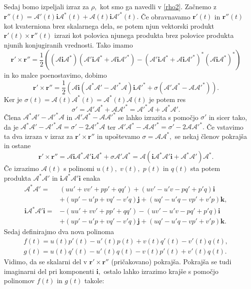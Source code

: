 \documentclass[12pt,a4paper,twoside]{article}
\theoremstyle{definition} %
\theoremstyle{plain} %
\numberwithin{equation}{section}  %
\newcommand{\rV}{\mathbf{r}}
\newcommand{\iV}{\mathbf{i}}
\newcommand{\jV}{\mathbf{j}}
\newcommand{\kV}{\mathbf{k}}
\newcommand{\AQ}{\mathcal{A}}
\begin{document}
Sedaj bomo izpeljali izraz za $\rho,$ kot smo ga navedli v \eqref{rho2}. Začnemo z $\rV''(t)=\AQ'(t)\iV\AQ^*(t)+\AQ(t)\iV\AQ'^*(t).$ Če obravnavamo $\rV'(t)$ in $\rV''(t)$ kot kvaterniona brez skalarnega dela, se potem njun vektorski produkt $\rV'(t)\times\rV''(t)$ izrazi kot polovica njunega produkta brez polovice produkta njunih konjugiranih vrednosti. Tako imamo
\begin{equation*}
	\rV'\times\rV''=\frac{1}{2}\left ( (\AQ\iV\AQ^*)(\AQ'\iV\AQ^*+\AQ\iV\AQ'^*)-(\AQ'\iV\AQ^*+\AQ\iV\AQ'^*)^*(\AQ\iV\AQ^*)^* \right )
\end{equation*}
in ko malce poenostavimo, dobimo
\begin{equation*}
	\rV'\times\rV''=\frac{1}{2}\left ( \AQ\iV(\AQ^*\AQ'-\AQ'^*\AQ)\iV\AQ'^*+\sigma(\AQ'\AQ^*-\AQ\AQ'^*) \right ).
\end{equation*}
Ker je $\sigma(t)=\AQ(t)\AQ^*(t)=\AQ^*(t)\AQ(t)$ je potem res
\begin{equation*}
	\sigma'=\AQ'\AQ^*+\AQ\AQ'^*=\AQ'^*\AQ+\AQ^*\AQ'.
\end{equation*}
Člena $\AQ^*\AQ'-\AQ'^*\AQ$ in $\AQ'\AQ^*-\AQ\AQ'^*$ se lahko izrazita s pomočjo $\sigma'$ in sicer tako, da je $\AQ^*\AQ'-\AQ'^*\AQ=\sigma'-2\AQ'^*\AQ$ ter $\AQ'\AQ^*-\AQ\AQ'^*=\sigma'-2\AQ\AQ'^*.$ Če vstavimo ta dva izraza v izraz za $\rV'\times\rV''$ in upoštevamo $\sigma=\AQ\AQ^*,$ se nekaj členov pokrajša in ostane
\begin{equation*}
	\rV'\times\rV''=\AQ\iV\AQ^*\AQ'\iV\AQ^* + \sigma\AQ'\AQ^*=\AQ(\iV\AQ^*\AQ'\iV + \AQ^*\AQ')\AQ^*.
\end{equation*}
Če izrazimo $\AQ(t)$ s polinomi $u(t),$ $v(t),$ $p(t)$ in $q(t)$ sta potem produkta $\AQ^*\AQ'$ in $\iV\AQ^*\AQ'\iV$ enaka
\begin{align*}
	\AQ^*\AQ'=&(uu'+vv'+pp'+qq')+(uv'-u'v-pq'+p'q)\iV \\
	&+(up'-u'p+vq'-v'q)\jV+(uq'-u'q-vp'+v'p)\kV, \\
	\iV\AQ^*\AQ'\iV=&-(uu'+vv'+pp'+qq')-(uv'-u'v-pq'+p'q)\iV \\
	&+(up'-u'p+vq'-v'q)\jV+(uq'-u'q-vp'+v'p)\kV.
\end{align*}
Sedaj definirajmo dva nova polinoma
\begin{align}
	f(t)=u(t)p'(t)-u'(t)p(t)+v(t)q'(t)-v'(t)q(t), \nonumber \\
	g(t)=u(t)q'(t)-u'(t)q(t)-v(t)p'(t)+v'(t)q(t). \label{polinoma_f_g}
\end{align}
Vidimo, da se skalarni del v $\rV'\times\rV''$ (pričakovano) pokrajša. Pokrajša se tudi imaginarni del pri komponenti $\iV,$ ostalo lahko izrazimo krajše s pomočjo polinomov $f(t)$ in $g(t)$ takole:
\end{document}
